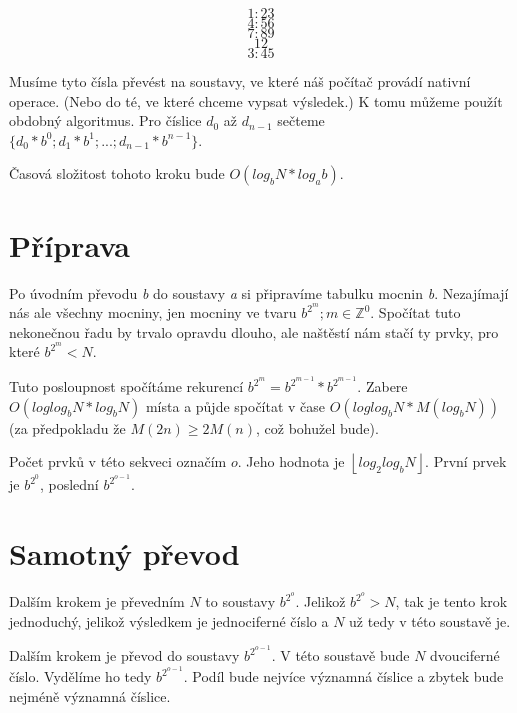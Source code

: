 \documentclass{article}
\begin{document}
\begin{equation*}
    1:23
\end{equation*}
\begin{equation*}
    4:56
\end{equation*}
\begin{equation*}
    7:89
\end{equation*}
\begin{equation*}
    12
\end{equation*}
\begin{equation*}
    3:45
\end{equation*}

Musíme tyto čísla převést na soustavy, ve které náš počítač provádí nativní operace. (Nebo do té, ve které chceme vypsat výsledek.) K tomu můžeme použít obdobný algoritmus. Pro číslice \(d_0\) až \(d_{n-1}\) sečteme \(\{d_0 * b^0; d_1 * b^1; ...; d_{n-1} * b^{n-1}\}\).

Časová složitost tohoto kroku bude \(O(log_b N * log_a b)\).

\section*{Příprava}

Po úvodním převodu \emph{b} do soustavy \emph{a} si připravíme tabulku mocnin \emph{b}. Nezajímají nás ale všechny mocniny, jen mocniny ve tvaru \(b^{2^m}; m \in \mathbb{Z}^0\). Spočítat tuto nekonečnou řadu by trvalo opravdu dlouho, ale naštěstí nám stačí ty prvky, pro které \(b^{2^m} < N\).

Tuto posloupnost spočítáme rekurencí \(b^{2^m} = b^{2^{m-1}} * b^{2^{m-1}}\). Zabere \(O(log log_b N * log_b N)\) místa a půjde spočítat v čase \(O(log log_b N * M(log_b N))\) (za předpokladu že \(M(2n) \ge 2M(n)\), což bohužel bude).

Počet prvků v této sekveci označím \(o\). Jeho hodnota je \(\left\lfloor log_2 log_b N \right\rfloor \). První prvek je \(b^{2^0}\), poslední \(b^{2^{o - 1}}\).

\section*{Samotný převod}

Dalším krokem je převedním \(N\) to soustavy \(b^{2^{o}}\). Jelikož \(b^{2^{o}} > N\), tak je tento krok jednoduchý, jelikož výsledkem je jednociferné číslo a \(N\) už tedy v této soustavě je.

Dalším krokem je převod do soustavy \(b^{2^{o - 1}}\). V této soustavě bude \(N\) dvouciferné číslo. Vydělíme ho tedy \(b^{2^{o - 1}}\). Podíl bude nejvíce významná číslice a zbytek bude nejméně významná číslice.
\end{document}
